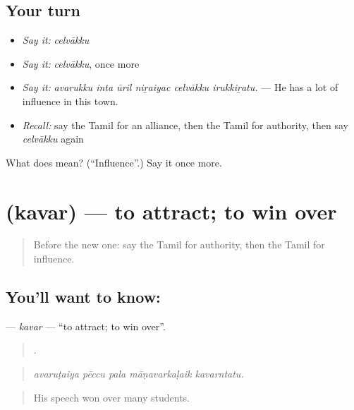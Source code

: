 \subsection*{Your turn}
\begin{itemize}
\raggedright
  \item \emph{Say it:} \emph{celvākku}
  \item \emph{Say it:} \emph{celvākku}, once more
  \item \emph{Say it:} \emph{avarukku inta ūril niṟaiyac celvākku irukkiṟatu.} — He has a lot of influence in this town.
  \item \emph{Recall:} say the Tamil for an alliance, then the Tamil for authority, then say \emph{celvākku} again
\end{itemize}

\begin{tcolorbox}[breakable,colback=teal!4,colframe=teal!35!black,title={Before you move on}]
What does  mean? (\textquotedblleft{}Influence\textquotedblright{}.) Say it once more.
\end{tcolorbox}
\section[\texorpdfstring{\ta{கவர்} (kavar)}{கவர் (kavar)}]{ (kavar) — to attract; to win over}

\label{lesson:TA-C375-kavar}



\begin{quote}
Before the new one: say the Tamil for authority, then the Tamil for influence.
\end{quote}

\subsection*{You'll want to know: }
\textbf{} — \emph{kavar} — \textquotedblleft{}to attract; to win over\textquotedblright{}.

\begin{quote}
    .
\end{quote}

\begin{quote}
\emph{avaruṭaiya pēccu pala māṇavarkaḷaik kavarntatu.}
\end{quote}

\begin{quote}
His speech won over many students.
\end{quote}

